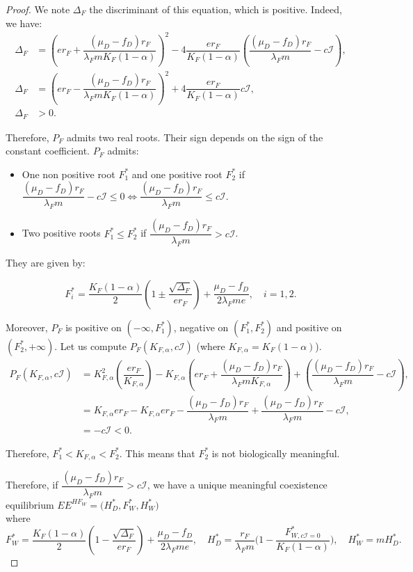 \documentclass{article}
\newcommand{\lfw}{\lambda_{F}}
\newcommand{\lfw}{\lambda_{F}}
\begin{document}
\begin{proof}
We note $\Delta_F$ the discriminant of this equation, which is positive. Indeed, we have:
\begin{align*}
\Delta_F &= \left(er_F + \dfrac{(\mu_D - f_D) r_F}{\lfw m K_F(1-\alpha)} \right)^2 - 4\dfrac{er_F}{K_F(1-\alpha)}  \left(\dfrac{(\mu_D -f_D) r_F}{\lfw m} - c\mathcal{I} \right), \\
\Delta_F &= \left(er_F - \dfrac{(\mu_D - f_D) r_F}{\lfw m K_F(1-\alpha)} \right)^2 + 4\dfrac{er_F}{K_F(1-\alpha)}  c\mathcal{I}, \\
\Delta_F & > 0.
\end{align*}

Therefore, $P_F$ admits two real roots. Their sign depends on the sign of the constant coefficient. $P_F$ admits:
\begin{itemize}
\item One non positive root $F^*_1$ and one positive root $F^*_2$ if $\dfrac{(\mu_D - f_D) r_F}{\lfw m} - c\mathcal{I} \leq 0 \Leftrightarrow \dfrac{(\mu_D - f_D) r_F}{\lfw m } \leq c\mathcal{I}.$
\item Two positive roots $F^*_1\leq  F^*_2$ if $\dfrac{(\mu_D - f_D) r_F}{\lfw m } > c\mathcal{I}$.
\end{itemize}
They are given by:

\begin{equation*}
F_i^* = \dfrac{K_F(1-\alpha)}{2}\left(1 \pm \dfrac{\sqrt{\Delta_F}}{er_F}\right) + \dfrac{\mu_D - f_D}{2\lfw m e}, \quad i=1,2.
\end{equation*}

Moreover, $P_F$ is positive on $(-\infty, F_1^*)$, negative on $(F^*_1, F^*_2)$ and positive on $(F^*_2, +\infty)$. Let us compute $P_F(K_{F,\alpha},c\mathcal{I})$ (where $ K_{F,\alpha} = K_F(1-\alpha)$).
\begin{align*}
P_F(K_{F,\alpha},c\mathcal{I}) &= K_{F,\alpha}^2 \left(\dfrac{er_F}{K_{F,\alpha}} \right) - K_{F,\alpha} \left(er_F + \dfrac{(\mu_D - f_D) r_F}{\lfw m K_{F,\alpha}} \right) + \left(\dfrac{(\mu_D - f_D) r_F}{\lfw m} - c\mathcal{I} \right), \\
&= K_{F,\alpha}er_F - K_{F,\alpha}er_F - \dfrac{(\mu_D - f_D) r_F}{\lfw m} + \dfrac{(\mu_D - f_D) r_F}{\lfw m} - c\mathcal{I}, \\
&= -c\mathcal{I}< 0.
\end{align*}

Therefore, $F_1^* < K_{F, \alpha} < F_2^*$. This means that $F_2^*$ is not biologically meaningful.%

Therefore, if $\dfrac{(\mu_D - f_D) r_F}{\lfw m} > c\mathcal{I}$, we have a unique meaningful coexistence equilibrium $EE^{HF_W} = \Big(H^*_{D}, F^*_{W}, H^*_{W} \Big)$ \\ 
where $$F^*_{W} = \dfrac{K_F(1-\alpha)}{2}\left(1 - \dfrac{\sqrt{\Delta_F}}{er_F}\right) + \dfrac{\mu_D - f_D}{2\lfw m e},\quad
H^*_{D} = \dfrac{r_F}{\lfw m} \Big(1 - \dfrac{F^*_{W, c\mathcal{I} = 0}}{K_F(1-\alpha)} \Big),
\quad 
H^*_{W} = m H^*_{D}.$$
\end{proof}
\end{document}
